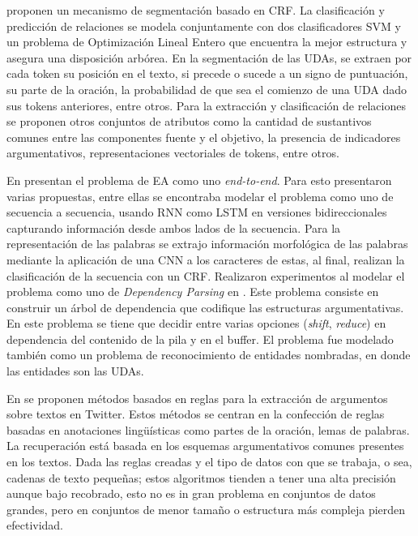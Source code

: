 \textcite{stab2017parsing} proponen un mecanismo de segmentación basado en CRF. La clasificación
y predicción de relaciones se modela conjuntamente con dos clasificadores SVM y un problema
de Optimización Lineal Entero que encuentra la mejor estructura y asegura una disposición arbórea. En la segmentación
de las UDAs, se extraen por cada token su posición en el texto, si precede o sucede a un signo de puntuación, su parte de
la oración, la probabilidad de que sea el comienzo de una UDA dado sus tokens anteriores, entre otros. Para la extracción
y clasificación de relaciones se proponen otros conjuntos de atributos como la cantidad de sustantivos comunes entre
las componentes fuente y el objetivo, la presencia de indicadores argumentativos, representaciones vectoriales de tokens,
entre otros.

En \textcite{eger2017neural} presentan el problema de EA como uno \emph{end-to-end}. 
Para esto presentaron varias propuestas, entre ellas se encontraba
modelar el problema como uno de secuencia a secuencia, usando RNN como 
LSTM en versiones bidireccionales capturando información desde ambos lados de la secuencia.
Para la representación de las palabras se extrajo información morfológica de las palabras mediante 
la aplicación de una CNN a los caracteres de estas,
al final, realizan la clasificación de la secuencia con un CRF. 
Realizaron experimentos al modelar el problema como uno de \emph{Dependency Parsing} en \cite{kiperwasser2016simple}. Este problema
consiste en construir un árbol de dependencia que codifique las estructuras argumentativas. En este problema 
se tiene que decidir entre varias opciones (\emph{shift}, \emph{reduce}) en dependencia del contenido de la pila y en el buffer.
El problema fue modelado también como un problema de reconocimiento de entidades nombradas, en donde las entidades son las UDAs.

En \textcite{dykes2020reconstructing} se proponen métodos basados en reglas para la extracción de argumentos sobre
textos en Twitter. Estos métodos se centran en la confección de reglas basadas en anotaciones lingüísticas como
partes de la oración, lemas de palabras. La recuperación está basada en los esquemas argumentativos comunes presentes
en los textos. Dada las reglas creadas y el tipo
de datos con que se trabaja, o sea, cadenas de texto pequeñas; estos algoritmos tienden a tener una alta precisión aunque 
bajo recobrado, esto no es in gran problema en conjuntos de datos grandes, pero en conjuntos de menor tamaño o estructura 
más compleja pierden efectividad.

